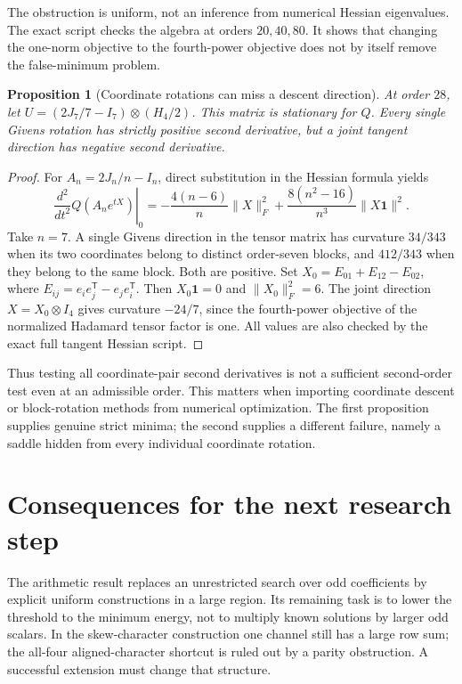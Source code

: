 \documentclass[11pt]{article}
\newtheorem{proposition}{Proposition}[section]
\newcommand{\one}{\mathbf 1}
\begin{document}
The obstruction is uniform, not an inference from numerical Hessian
eigenvalues. The exact script checks the algebra at orders $20,40,80$.
It shows that changing the one-norm objective to the fourth-power
objective does not by itself remove the false-minimum problem.

\begin{proposition}[Coordinate rotations can miss a descent direction]
At order $28$, let
$U=(2J_7/7-I_7)\otimes(H_4/2)$. This matrix is stationary for $Q$.
Every single Givens rotation has strictly positive second derivative,
but a joint tangent direction has negative second derivative.
\end{proposition}
\begin{proof}
For $A_n=2J_n/n-I_n$, direct substitution in the Hessian formula yields
\[
 \left.\frac{d^2}{dt^2}Q(A_ne^{tX})\right|_0
 =-\frac{4(n-6)}n\|X\|_F^2
  +\frac{8(n^2-16)}{n^3}\|X\one\|^2.
\]
Take $n=7$. A single Givens direction in the tensor matrix has
curvature $34/343$ when its two coordinates belong to distinct
order-seven blocks, and $412/343$ when they belong to the same block.
Both are positive. Set
$X_0=E_{01}+E_{12}-E_{02}$, where
$E_{ij}=e_ie_j^{\mathsf T}-e_je_i^{\mathsf T}$. Then
$X_0\one=0$ and $\|X_0\|_F^2=6$. The joint direction
$X=X_0\otimes I_4$ gives curvature $-24/7$, since the fourth-power
objective of the normalized Hadamard tensor factor is one.
All values are also checked by the exact full tangent Hessian script.
\end{proof}
Thus testing all coordinate-pair second derivatives is not a sufficient
second-order test even at an admissible order. This matters when
importing coordinate descent or block-rotation methods from numerical
optimization. The first proposition supplies genuine strict minima;
the second supplies a different failure, namely a saddle hidden from
every individual coordinate rotation.

\section{Consequences for the next research step}
The arithmetic result replaces an unrestricted search over odd
coefficients by explicit uniform constructions in a large region.
Its remaining task is to lower the threshold to the minimum energy,
not to multiply known solutions by larger odd scalars. In the
skew-character construction one channel still has a large row sum;
the all-four aligned-character shortcut is ruled out by a parity
obstruction. A successful extension must change that structure.
\end{document}
